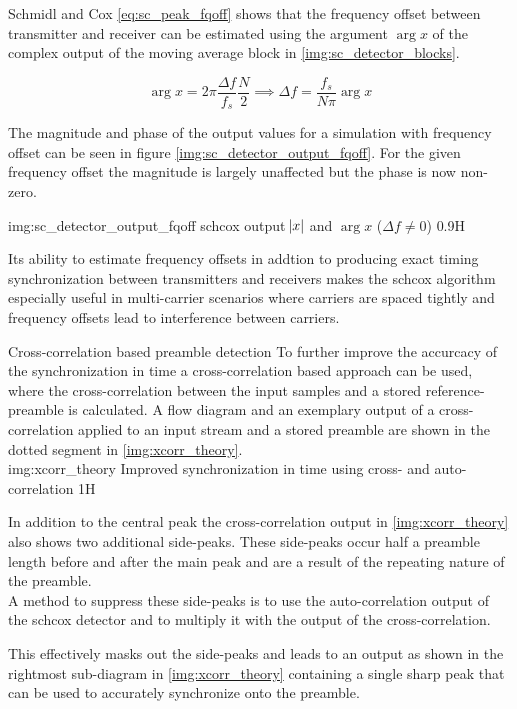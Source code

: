 \begin{subchapter}{Schmidl and Cox}
  \autoref{eq:sc_peak_fqoff} shows that the frequency offset between transmitter
  and receiver can be estimated using the argument $\arg{x}$ of the complex output of the
  moving average block in \autoref{img:sc_detector_blocks}.

  \begin{equation*}
    \arg{x} = 2 \pi \frac{\Delta f}{f_s} \frac{N}{2} \implies \Delta f = \frac{f_s}{N \pi} \arg{x}
  \end{equation*}

  The magnitude and phase of the output values for a simulation with
  frequency offset can be seen in figure \ref{img:sc_detector_output_fqoff}.
  For the given frequency offset the magnitude is largely unaffected but
  the phase is now non-zero.

               {img:sc_detector_output_fqoff}
               {\acrshort{schcox} output $\abs{x}$ and $\arg{x}$ ($\Delta f \neq 0$)}
               {0.9}{H}
\end{subchapter}

Its ability to estimate frequency offsets in addtion to producing
exact timing synchronization between transmitters and
receivers makes the \acrshort{schcox} algorithm especially useful
in multi-carrier scenarios where carriers are spaced tightly and
frequency offsets lead to interference between carriers.

\begin{subchapter}{Cross-correlation based preamble detection}
  \label{sec:xcorrtheo}
  To further improve the accurcacy of the synchronization in time
  a cross-correlation based approach can be used, where the cross-correlation
  between the input samples and a stored reference-preamble is
  calculated.
  A flow diagram and an exemplary output of a cross-correlation
  applied to an input stream and a stored preamble are shown
  in the dotted segment in \autoref{img:xcorr_theory}. \\

               {img:xcorr_theory}
               {Improved synchronization in time using cross- and auto-correlation}
               {1}{H}

  In addition to the central peak the cross-correlation output
  in \autoref{img:xcorr_theory} also shows two additional side-peaks.
  These side-peaks occur half a preamble length before and after
  the main peak and are a result of the repeating nature of
  the preamble. \\

  A method to suppress these side-peaks is to use the auto-correlation
  output of the \gls{schcox} detector and to multiply it with the
  output of the cross-correlation\cite{awoseyila}.

  This effectively masks out the side-peaks and leads to an output as
  shown in the rightmost sub-diagram in \autoref{img:xcorr_theory} containing
  a single sharp peak that can be used to accurately synchronize
  onto the preamble.
\end{subchapter}

